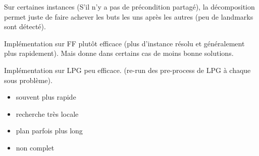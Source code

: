 \begin{frame}
  \begin{block}{}
    Sur certaines instances (S'il n'y a pas de précondition partagé), la décomposition permet juste de faire achever les buts les uns après les autres (peu de landmarks sont détecté).
  \end{block}
  
  \begin{block}{}
    Implémentation sur FF plutôt efficace (plus d'instance résolu et généralement plus rapidement). Mais donne dans certains cas de moins bonne solutions.

    Implémentation sur LPG peu efficace. (re-run des pre-process de LPG à chaque sous problème).
  \end{block}

  \begin{block}{}
    \begin{itemize}
      \item souvent plus rapide
      \item recherche très locale
      \item plan parfois plus long
      \item non complet
    \end{itemize}
  \end{block}
\end{frame}

